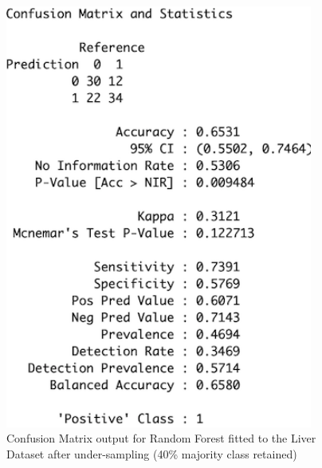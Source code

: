 \begin{figure}[!htbp]
\begin{minipage}{0.45\textwidth}
        \includegraphics[width=0.9\textwidth]{ThesisTemplate/appendix/images/Chapter5Appendix/ConfusionMatrix40/Liver.png}
        \caption{Confusion Matrix output for Random Forest fitted to the Liver Dataset after under-sampling (40\% majority class retained)}
        \label{fig:matrixLiver40}
    \end{minipage}
\end{figure}

